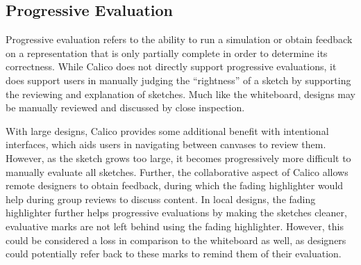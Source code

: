 \documentclass[12pt,fleqn]{ucithesis}
\begin{document}



\subsection{Progressive Evaluation}
Progressive evaluation refers to the ability to run a simulation or obtain feedback on a representation that is only partially complete in order to determine its correctness. While Calico does not directly support progressive evaluations, it does support users in manually judging the ``rightness'' of a sketch by supporting the reviewing and explanation of sketches. Much like the whiteboard, designs may be manually reviewed and discussed by close inspection. 

With large designs, Calico provides some additional benefit with intentional interfaces, which aids users in navigating between canvases to review them. However, as the sketch grows too large, it becomes progressively more difficult to manually evaluate all sketches. Further, the collaborative aspect of Calico allows remote designers to obtain feedback, during which the fading highlighter would help during group reviews to discuss content. In local designs, the fading highlighter further helps progressive evaluations by making the sketches cleaner, evaluative marks are not left behind using the fading highlighter. However, this could be considered a loss in comparison to the whiteboard as well, as designers could potentially refer back to these marks to remind them of their evaluation.
\end{document}
